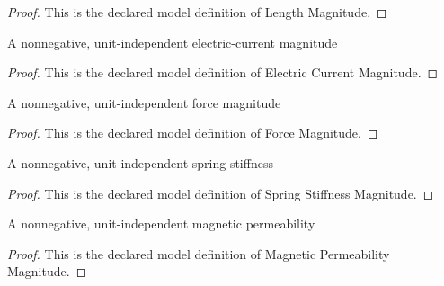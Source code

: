 \begin{proof}
  This is the declared model definition of Length Magnitude.
\end{proof}
\begin{definition}
  \label{def:physics:phyx-mini-0968:phyxminiproblems-problemphyxmini0968-electriccurrentmagnitude}
  A nonnegative, unit-independent electric-current magnitude
\end{definition}
\begin{proof}
  This is the declared model definition of Electric Current Magnitude.
\end{proof}
\begin{definition}
  \label{def:physics:phyx-mini-0968:phyxminiproblems-problemphyxmini0968-forcemagnitude}
  A nonnegative, unit-independent force magnitude
\end{definition}
\begin{proof}
  This is the declared model definition of Force Magnitude.
\end{proof}
\begin{definition}
  \label{def:physics:phyx-mini-0968:phyxminiproblems-problemphyxmini0968-springstiffnessmagnitude}
  A nonnegative, unit-independent spring stiffness
\end{definition}
\begin{proof}
  This is the declared model definition of Spring Stiffness Magnitude.
\end{proof}
\begin{definition}
  \label{def:physics:phyx-mini-0968:phyxminiproblems-problemphyxmini0968-magneticpermeabilitymagnitude}
  A nonnegative, unit-independent magnetic permeability
\end{definition}
\begin{proof}
  This is the declared model definition of Magnetic Permeability Magnitude.
\end{proof}
